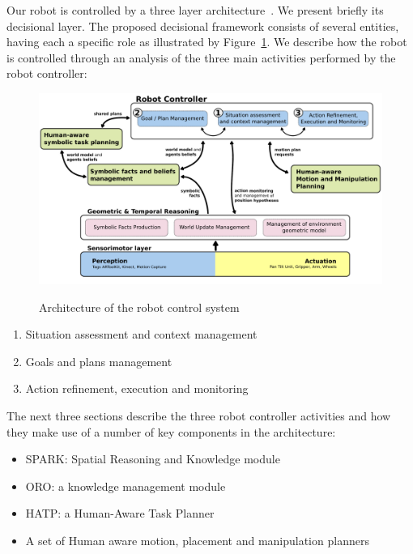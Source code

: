 \documentclass{svmult}
\begin{document}
Our robot is controlled by a three layer
architecture~\cite{Alami1998}.  We present briefly its decisional
layer. The proposed decisional framework consists of several entities,
having each a specific role as illustrated by
Figure~\ref{architecture_fg}.  We describe how the robot is controlled
through an analysis of the three main activities performed by the
robot controller:

\begin{figure}[thpb]
  \centering
  \includegraphics[width=1.0\textwidth]{./figs/supervisor-architecture-new.pdf} \\
  \caption {Architecture of the robot control system}
  \label{architecture_fg}
\end{figure}

\begin {enumerate}
\item Situation assessment and context management 
\item Goals and plans management
\item Action refinement, execution and monitoring
\end {enumerate}

The next three sections describe the three robot controller
activities and how they make use of a number of key components in the
architecture:

\begin{itemize}
\item SPARK: Spatial Reasoning and Knowledge module \cite{Sisbot2011}
\item ORO: a knowledge management module \cite{Lemaignan2010}
\item HATP: a Human-Aware Task Planner \cite{Alili2008}
\item A set of Human aware motion, placement and manipulation planners
 \cite{Sisbot2008, Mainprice2011, Pandey2010}
\end{itemize}
\end{document}
